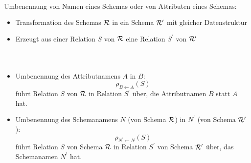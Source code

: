 \begin{frame}\frametitle{\insertsection}
\framesubtitle{\insertsubsection}
\\[8pt]
\begin{block}{}
	Umbenennung von Namen eines Schemas oder von Attributen eines Schemas:
	\begin{itemize}
		\item	Transformation des Schemas $\mathcal{R}$ in ein Schema $\mathcal{R}^\prime$ mit gleicher Datenstruktur
		\item Erzeugt aus einer Relation $S$ von $\mathcal{R}$ eine Relation $S^\prime$ von $\mathcal{R}^\prime$
	\end{itemize}
\end{block}
\end{frame}

\begin{frame}\frametitle{\insertsection}
\framesubtitle{\insertsubsection}
\\[8pt]
\begin{block}{}
\begin{itemize}
	\item Umbenennung des Attributnamens $A$ in $B$:
	\begin{equation*}
	\rho_{B\leftarrow A}(S)
	\end{equation*} 		
	f\"uhrt Relation $S$ von $\mathcal{R}$ in Relation $S^\prime$ \"uber, die Attributnamen $B$ statt $A$ hat.
	\item Umbenennung des Schemanamens $N$ (von Schema $\mathcal{R}$) in $N^\prime$ (von Schema $\mathcal{R}^\prime$): 
	\begin{equation*}
	\rho_{N^\prime\leftarrow N}(S)
	\end{equation*} 		
	f\"uhrt Relation $S$ von Schema $\mathcal{R}$ in Relation $S^\prime$ von Schema $\mathcal{R}^\prime$ \"uber, das Schemanamen 
	$N^\prime$ hat.
\end{itemize}
\end{block}
\end{frame}

